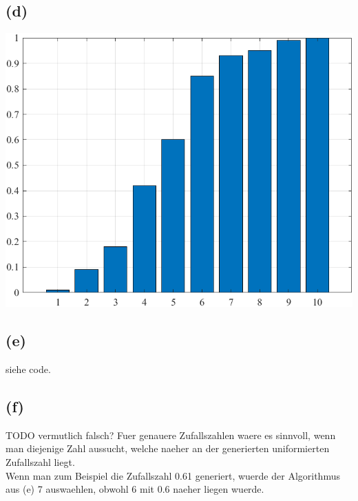 \documentclass[a4paper]{scrartcl}
\begin{document}
\subsection*{(d)}

\begin{center}
	\includegraphics*[scale = 0.5]{question4d.png}
\end{center}
\subsection*{(e)}
siehe code.
\subsection*{(f)} TODO vermutlich falsch?
Fuer genauere Zufallszahlen waere es sinnvoll, wenn man diejenige Zahl aussucht, welche naeher an der generierten uniformierten Zufallszahl liegt. \\
Wenn man zum Beispiel die Zufallszahl 0.61 generiert, wuerde der Algorithmus aus (e) 7 auswaehlen, obwohl 6 mit 0.6 naeher liegen wuerde. 
\end{document}
